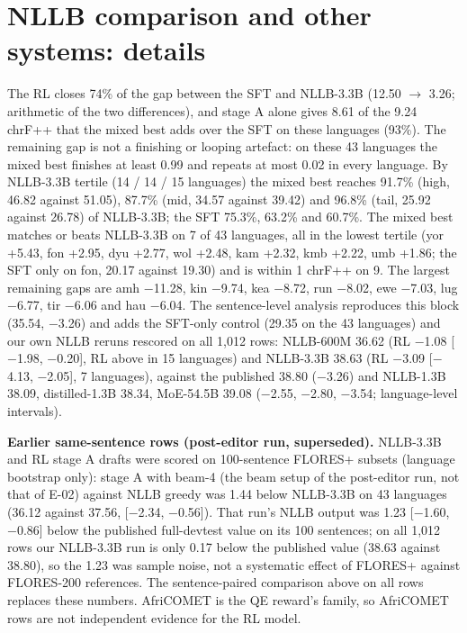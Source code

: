 

\section{NLLB comparison and other systems: details}\label{app:afrique}

The RL closes 74\% of the gap between the SFT and NLLB-3.3B (12.50 $\to$ 3.26; arithmetic of the two differences), and stage A alone gives 8.61 of the 9.24 chrF++ that the mixed best adds over the SFT on these languages (93\%). The remaining gap is not a finishing or looping artefact: on these 43 languages the mixed best finishes at least 0.99 and repeats at most 0.02 in every language. By NLLB-3.3B tertile (14 / 14 / 15 languages) the mixed best reaches 91.7\% (high, 46.82 against 51.05), 87.7\% (mid, 34.57 against 39.42) and 96.8\% (tail, 25.92 against 26.78) of NLLB-3.3B; the SFT 75.3\%, 63.2\% and 60.7\%. The mixed best matches or beats NLLB-3.3B on 7 of 43 languages, all in the lowest tertile (yor +5.43, fon +2.95, dyu +2.77, wol +2.48, kam +2.32, kmb +2.22, umb +1.86; the SFT only on fon, 20.17 against 19.30) and is within 1 chrF++ on 9. The largest remaining gaps are amh \ensuremath{-}11.28, kin \ensuremath{-}9.74, kea \ensuremath{-}8.72, run \ensuremath{-}8.02, ewe \ensuremath{-}7.03, lug \ensuremath{-}6.77, tir \ensuremath{-}6.06 and hau \ensuremath{-}6.04. The sentence-level analysis reproduces this block (35.54, \ensuremath{-}3.26) and adds the SFT-only control (29.35 on the 43 languages) and our own NLLB reruns rescored on all 1,012 rows: NLLB-600M 36.62 (RL \ensuremath{-}1.08 [\ensuremath{-}1.98, \ensuremath{-}0.20], RL above in 15 languages) and NLLB-3.3B 38.63 (RL \ensuremath{-}3.09 [\ensuremath{-}4.13, \ensuremath{-}2.05], 7 languages), against the published 38.80 (\ensuremath{-}3.26) and NLLB-1.3B 38.09, distilled-1.3B 38.34, MoE-54.5B 39.08 (\ensuremath{-}2.55, \ensuremath{-}2.80, \ensuremath{-}3.54; language-level intervals). 

\textbf{Earlier same-sentence rows (post-editor run, superseded).} NLLB-3.3B and RL stage A drafts were scored on 100-sentence FLORES+ subsets (language bootstrap only): stage A with beam-4 (the beam setup of the post-editor run, not that of E-02) against NLLB greedy was 1.44 below NLLB-3.3B on 43 languages (36.12 against 37.56, [\ensuremath{-}2.34, \ensuremath{-}0.56]). That run's NLLB output was 1.23 [\ensuremath{-}1.60, \ensuremath{-}0.86] below the published full-devtest value on its 100 sentences; on all 1,012 rows our NLLB-3.3B run is only 0.17 below the published value (38.63 against 38.80), so the 1.23 was sample noise, not a systematic effect of FLORES+ against FLORES-200 references. The sentence-paired comparison above on all rows replaces these numbers. AfriCOMET is the QE reward's family, so AfriCOMET rows are not independent evidence for the RL model. 

